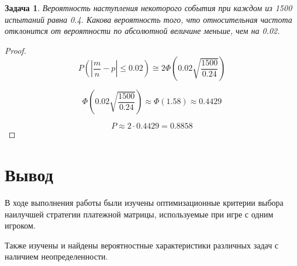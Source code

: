 \documentclass[14pt,a4paper]{extarticle}%
\newtheorem{task}[theorem]{Задача}
\begin{document}
\begin{task}
  Вероятность наступления некоторого события при каждом из 1500
  испытаний равна 0.4. Какова вероятность того, что относительная
  частота отклонится от вероятности по абсолютной величине меньше,
  чем на 0.02.
\end{task}

\begin{proof}
  \[
    P(\left\lvert \frac{m}{n} - p \right\rvert \leq 0.02)
    \cong 2\Phi\left(0.02\sqrt{\frac{1500}{0.24}}\right)
  \]

  \[
    \Phi\left(0.02\sqrt{\frac{1500}{0.24}}\right) \approx \Phi(1.58) \approx 0.4429
  \]

  \[
    P \approx 2 \cdot 0.4429 = 0.8858
  \]
\end{proof}

\section{Вывод}
В ходе выполнения работы были изучены оптимизационные критерии выбора
наилучшей стратегии платежной матрицы, используемые при игре с одним игроком.

Также изучены и найдены вероятностные характеристики различных задач с наличием неопределенности.
\end{document}
